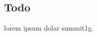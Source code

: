 \documentclass[a4paper]{article}
\begin{document}
\subsection{Todo}
lorem ipsum dolar summit1g.

\nocite{*}



\end{document}
